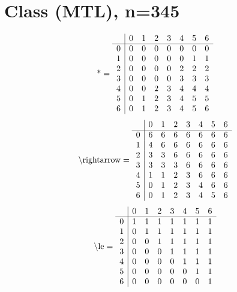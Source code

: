 \documentclass[11pt]{article}
\begin{document}
\section{Class (MTL), n=345}
\[\text{*} = 
\begin{array}{r | r r r r r r r}
 & 0 & 1 & 2 & 3 & 4 & 5 & 6 \\ \hline
0 & 0 & 0 & 0 & 0 & 0 & 0 & 0 \\
1 & 0 & 0 & 0 & 0 & 0 & 1 & 1 \\
2 & 0 & 0 & 0 & 0 & 2 & 2 & 2 \\
3 & 0 & 0 & 0 & 0 & 3 & 3 & 3 \\
4 & 0 & 0 & 2 & 3 & 4 & 4 & 4 \\
5 & 0 & 1 & 2 & 3 & 4 & 5 & 5 \\
6 & 0 & 1 & 2 & 3 & 4 & 5 & 6 \\
\end{array}
\]
\[\text{\textbackslash rightarrow} = 
\begin{array}{r | r r r r r r r}
 & 0 & 1 & 2 & 3 & 4 & 5 & 6 \\ \hline
0 & 6 & 6 & 6 & 6 & 6 & 6 & 6 \\
1 & 4 & 6 & 6 & 6 & 6 & 6 & 6 \\
2 & 3 & 3 & 6 & 6 & 6 & 6 & 6 \\
3 & 3 & 3 & 3 & 6 & 6 & 6 & 6 \\
4 & 1 & 1 & 2 & 3 & 6 & 6 & 6 \\
5 & 0 & 1 & 2 & 3 & 4 & 6 & 6 \\
6 & 0 & 1 & 2 & 3 & 4 & 5 & 6 \\
\end{array}
\]
\[\text{\textbackslash le} = 
\begin{array}{r | r r r r r r r}
 & 0 & 1 & 2 & 3 & 4 & 5 & 6 \\ \hline
0 & 1 & 1 & 1 & 1 & 1 & 1 & 1 \\
1 & 0 & 1 & 1 & 1 & 1 & 1 & 1 \\
2 & 0 & 0 & 1 & 1 & 1 & 1 & 1 \\
3 & 0 & 0 & 0 & 1 & 1 & 1 & 1 \\
4 & 0 & 0 & 0 & 0 & 1 & 1 & 1 \\
5 & 0 & 0 & 0 & 0 & 0 & 1 & 1 \\
6 & 0 & 0 & 0 & 0 & 0 & 0 & 1 \\
\end{array}
\]
\end{document}
